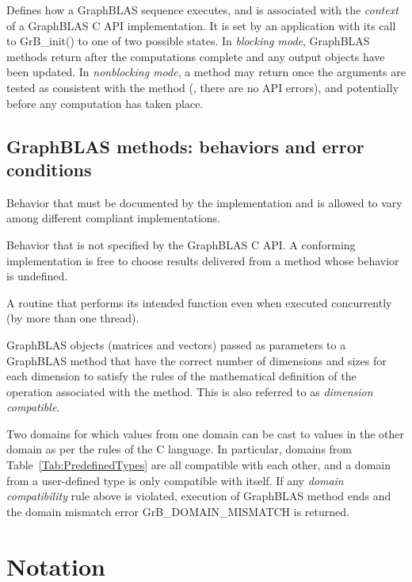  Defines how a GraphBLAS sequence executes, and is associated 
with the {\it context} of a GraphBLAS C API implementation. It is set by an 
application with its call to {\sf GrB\_init()} to one of two possible states.  
In \emph{blocking mode}, GraphBLAS methods return after the computations 
complete and any output objects have been updated.  In {\it nonblocking mode}, a 
method may return once the arguments are tested as consistent with 
the method (\ie, there are no API errors), and potentially before any computation 
has taken place.
\glossEnd

\subsection{GraphBLAS methods: behaviors and error conditions}
\glossBegin
{} Behavior that must be documented
by the implementation and is allowed to vary among different
compliant implementations. 

 Behavior that is not specified by the GraphBLAS C API.
A conforming implementation is free to choose results delivered from a method
whose behavior is undefined. 

 A routine that performs its intended 
function even when executed concurrently (by more than one thread).

 GraphBLAS objects (matrices and vectors) 
passed as parameters to a GraphBLAS method that have the correct number of dimensions 
and sizes for each dimension to satisfy the rules of the mathematical definition 
of the operation associated with the method.  This is also referred to as 
\emph{dimension compatible}.

 Two domains for which values from one domain can be 
cast to values in the other domain as per the rules of the C language. In particular, 
domains from Table~\ref{Tab:PredefinedTypes} 
are all compatible with each other, and a domain from a user-defined type is only 
compatible with itself. If any \emph{domain compatibility} rule above is 
violated, execution of GraphBLAS method ends and the domain 
mismatch error {\sf GrB\_DOMAIN\_MISMATCH} is returned.
\glossEnd

\vfill


\section{Notation}

